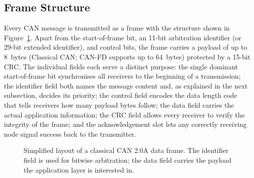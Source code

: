 \documentclass[11pt,a4paper,oneside,parskip=half]{scrreprt}
\begin{document}
\subsection{Frame Structure}
Every CAN message is transmitted as a frame with the structure shown in Figure~\ref{fig:can_frame}. Apart from the start-of-frame bit, an 11-bit arbitration identifier (or 29-bit extended identifier), and control bits, the frame carries a payload of up to 8~bytes (Classical CAN; CAN-FD supports up to 64~bytes) protected by a 15-bit CRC. The individual fields each serve a distinct purpose: the single dominant start-of-frame bit synchronises all receivers to the beginning of a transmission; the identifier field both names the message content and, as explained in the next subsection, decides its priority; the control field encodes the data length code that tells receivers how many payload bytes follow; the data field carries the actual application information; the CRC field allows every receiver to verify the integrity of the frame; and the acknowledgement slot lets any correctly receiving node signal success back to the transmitter.

\begin{figure}[H]
\centering
{}
\caption{Simplified layout of a classical CAN 2.0A data frame. The identifier field is used for bitwise arbitration; the data field carries the payload the application layer is interested in.}
\label{fig:can_frame}
\end{figure}
\end{document}
